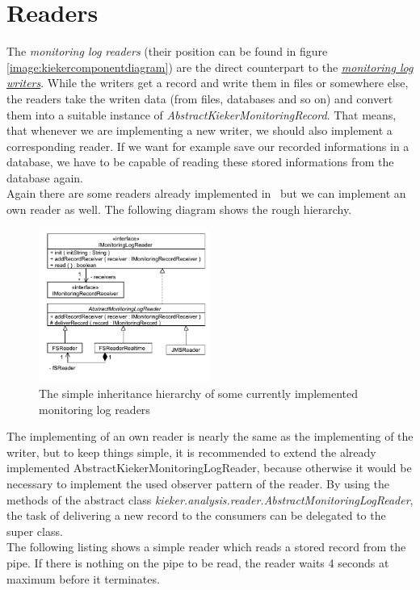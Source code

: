       \section{Readers}
	The \textit{monitoring log readers} (their position can be found in figure \ref{image:kiekercomponentdiagram}) are the direct counterpart to the \hyperlink{monitoringlogwriters}{\textit{monitoring log writers}}. While the writers get a record and write them in files or somewhere else, the readers take the writen data (from files, databases and so on) and convert them into a suitable instance of \textit{AbstractKiekerMonitoringRecord}. That means, that whenever we are implementing a new writer, we should also implement a corresponding reader. If we want for example save our recorded informations in a database, we have to be capable of reading these stored informations from the database again.\\
	Again there are some readers already implemented in \Kieker\ but we can implement an own reader as well. The following diagram shows the rough hierarchy.
	\begin{figure}[H]
	  \begin{center}
	    \includegraphics[width=0.5\textwidth]{./images/kieker_readerimpls.pdf}
	    \caption{The simple inheritance hierarchy of some currently implemented monitoring log readers}
	    \label{image:readers}
	  \end{center}
	\end{figure}
	The implementing of an own reader is nearly the same as the implementing of the writer, but to keep things simple, it is recommended to extend the already implemented AbstractKiekerMonitoringLogReader, because otherwise it would be necessary to implement the used observer pattern of the reader. By using the methods of the abstract class \textit{kieker.analysis.reader.AbstractMonitoringLogReader}, the task of delivering a new record to the consumers can be delegated to the super class.\\
	The following listing shows a simple reader which reads a stored record from the pipe. If there is nothing on the pipe to be read, the reader waits 4 seconds at maximum before it terminates.
	\setJavaCodeListing
	\lstset{caption=MyReader.java}
	

